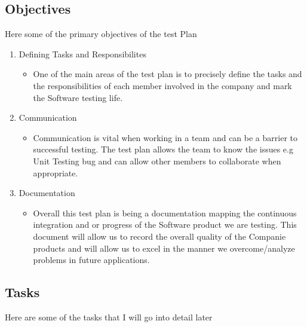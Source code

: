 \subsection{Objectives}
Here some of the primary  objectives of the test Plan
\begin{enumerate}
 
  
	\item Defining Tasks and Responsibilites 
   \begin{itemize}
     \item One of the main areas of the test plan is to precisely define the tasks and the responsibilities of each member involved in the company and mark the Software testing life.
   \end{itemize}


\item Communication 
   \begin{itemize}
     \item Communication is vital when working in a team and can be a barrier to successful testing. The test plan allows the team to know the issues e.g Unit Testing bug and can allow other members to collaborate when appropriate.
   \end{itemize}


\item Documentation 
   \begin{itemize}
     \item Overall this test plan is being a documentation mapping the continuous integration and or progress of the Software product we are testing. This document will allow us to record the overall quality of the Companie products and will allow us to excel in the manner we overcome/analyze problems in future applications. 
   \end{itemize}


   
\end{enumerate}


\subsection{Tasks}
Here are some of the tasks that I will go into detail later


